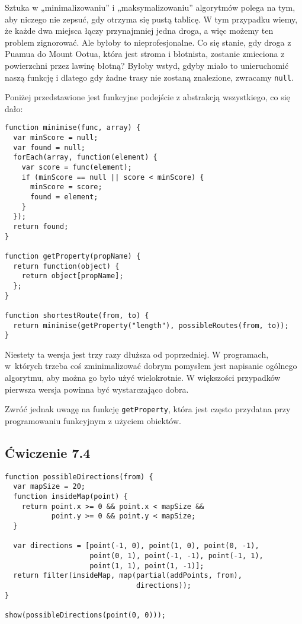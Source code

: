 Sztuka w „minimalizowaniu” i „maksymalizowaniu” algorytmów polega na tym, aby niczego nie zepsuć, gdy otrzyma się pustą tablicę. W tym przypadku wiemy, że każde dwa miejsca łączy przynajmniej jedna droga, a więc możemy ten problem zignorować. Ale byłoby to nieprofesjonalne. Co się stanie, gdy droga z Puamua do Mount Ootua, która jest stroma i błotnista, zostanie zmieciona z powierzchni przez lawinę błotną? Byłoby wstyd, gdyby miało to unieruchomić naszą funkcję i dlatego gdy żadne trasy nie zostaną znalezione, zwracamy \texttt{null}.

    
Poniżej przedstawione jest funkcyjne podejście z abstrakcją wszystkiego, co się dało:

    
\begin{verbatim} 
function minimise(func, array) {
  var minScore = null;
  var found = null;
  forEach(array, function(element) {
    var score = func(element);
    if (minScore == null || score < minScore) {
      minScore = score;
      found = element;
    }
  });
  return found;
}

function getProperty(propName) {
  return function(object) {
    return object[propName];
  };
}

function shortestRoute(from, to) {
  return minimise(getProperty("length"), possibleRoutes(from, to));
}
\end{verbatim}
    
Niestety ta wersja jest trzy razy dłuższa od poprzedniej. W programach, w~których trzeba coś zminimalizować dobrym pomysłem jest napisanie ogólnego algorytmu, aby można go było użyć wielokrotnie. W większości przypadków pierwsza wersja powinna być wystarczająco dobra.

    
Zwróć jednak uwagę na funkcję \texttt{getProperty}, która jest często przydatna przy programowaniu funkcyjnym z użyciem obiektów.


\subsection*{Ćwiczenie 7.4}
\label{sol:7.4}
    
\begin{verbatim} 
function possibleDirections(from) {
  var mapSize = 20;
  function insideMap(point) {
    return point.x >= 0 && point.x < mapSize &&
           point.y >= 0 && point.y < mapSize;
  }

  var directions = [point(-1, 0), point(1, 0), point(0, -1),
                    point(0, 1), point(-1, -1), point(-1, 1),
                    point(1, 1), point(1, -1)];
  return filter(insideMap, map(partial(addPoints, from),
                               directions));
}

show(possibleDirections(point(0, 0)));
\end{verbatim}
    
